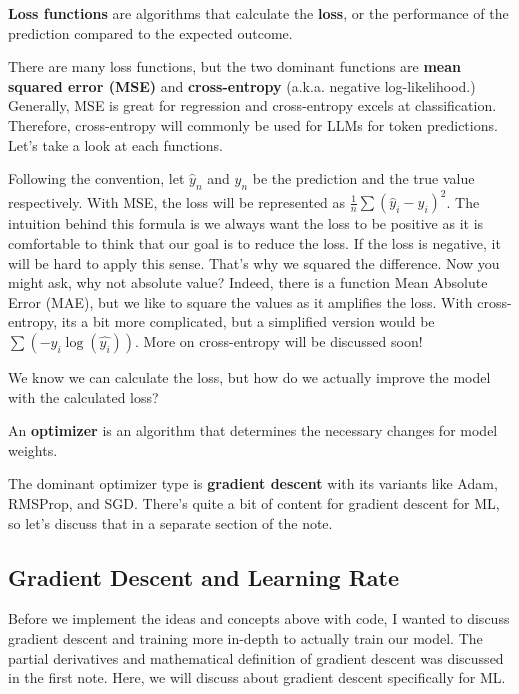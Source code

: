 \documentclass[../../main.tex]{subfiles}
\begin{document}
\begin{definition}{}{}
\textbf{Loss functions} are algorithms that calculate the
\textbf{loss}, or the performance of the prediction compared to
the expected outcome.
\end{definition}

There are many loss functions, but the two dominant functions are
\textbf{mean squared error (MSE)} and \textbf{cross-entropy} (a.k.a.
negative log-likelihood.) Generally, MSE is great for regression
and cross-entropy excels at classification. Therefore, cross-entropy
will commonly be used for LLMs for token predictions. Let's take a
look at each functions.

Following the convention, let $\hat{y}_n$ and $y_n$ be the prediction
and the true value respectively. With MSE, the loss will be
represented as $\frac{1}{n} \sum (\hat{y}_i - y_i)^2$. The intuition
behind this formula is we always want the loss to be positive as
it is comfortable to think that our goal is to reduce the loss.
If the loss is negative, it will be hard to apply this sense.
That's why we squared the difference. Now you might ask, why not
absolute value? Indeed, there is a function Mean Absolute Error (MAE),
but we like to square the values as it amplifies the loss.
With cross-entropy, its a bit more complicated, but a simplified
version would be $\sum (-y_i \log(\hat{y_i}))$. More on cross-entropy
will be discussed soon!

We know we can calculate the loss, but how do we actually improve
the model with the calculated loss?

\begin{definition}{}{}
An \textbf{optimizer} is an algorithm that determines the necessary
changes for model weights.
\end{definition}

The dominant optimizer type is \textbf{gradient descent} with its
variants like Adam, RMSProp, and SGD. There's quite a bit of content
for gradient descent for ML, so let's discuss that in a separate
section of the note.

\subsection{Gradient Descent and Learning Rate}

Before we implement the ideas and concepts above with code, I wanted
to discuss gradient descent and training more in-depth to actually
train our model. The partial derivatives and mathematical definition
of gradient descent was discussed in the first note. Here, we will
discuss about gradient descent specifically for ML.
\end{document}
